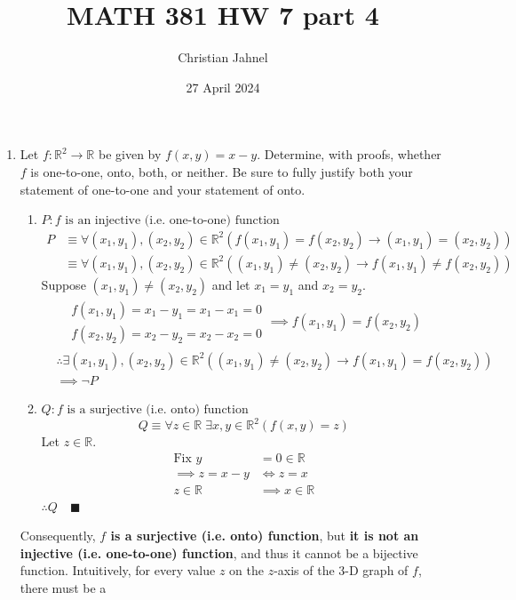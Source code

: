 \documentclass[letterpaper, 12pt]{article}
\title{MATH 381 HW 7 part 4}
\author{Christian Jahnel}
\date{27 April 2024}
\newcommand{\qed}{\quad \blacksquare}
\newcommand{\then}{\rightarrow}
\newcommand{\R}{\mathbb{R}}
\newcommand{\0}{\emptyset}
\begin{document}
\maketitle
\begin{enumerate}
\item Let $f: \R^2 \to \R$ be given by $f(x, y) = x - y$. Determine, with proofs, whether $f$ 
is one-to-one, onto, both, or neither. Be sure to fully justify both your statement of 
one-to-one and your statement of onto.
\begin{enumerate}
\item $P: \text{$f$ is an injective (i.e. one-to-one) function}$
\[\begin{split}
    P &\equiv \forall (x_1, y_1), (x_2, y_2) \in \R^2(f(x_1, y_1) = f(x_2, y_2) 
    \then (x_1, y_1) = (x_2, y_2)) \\
    &\equiv \forall (x_1, y_1), (x_2, y_2) \in \R^2((x_1, y_1) \ne (x_2, y_2) 
    \then f(x_1, y_1) \ne f(x_2, y_2))
\end{split}\]
Suppose $(x_1, y_1) \ne (x_2, y_2)$ and let $x_1 = y_1$ and $x_2 = y_2$.
\begin{gather*}
\begin{aligned}
    f(x_1, y_1) = x_1 - y_1 = x_1 - x_1 = 0 \\
    f(x_2, y_2) = x_2 - y_2 = x_2 - x_2 = 0
\end{aligned}
\implies f(x_1, y_1) = f(x_2, y_2)
\end{gather*}
\[\begin{split}
    &\therefore \exists (x_1, y_1), (x_2, y_2) \in \R^2 ((x_1, y_1) \ne (x_2, y_2) 
    \then f(x_1, y_1) = f(x_2, y_2)) \\
    &\implies \neg P
\end{split}\]
\item $Q: \text{$f$ is a surjective (i.e. onto) function}$
\[Q \equiv \forall z \in \R \; \exists x, y \in \R^2(f(x, y) = z)\]
Let $z \in \R$.
\begin{align*}
    \text{Fix } y &= 0 \in \R \\
    \implies z = x - y &\iff z = x \\
    z \in \R &\implies x \in \R
\end{align*}
$\therefore Q \qed$
\end{enumerate}
\begin{flushleft}
    Consequently, \textbf{$f$ is a surjective (i.e. onto) function}, but \textbf{it is not an 
    injective (i.e. one-to-one) function}, and thus it cannot be a bijective function. 
    Intuitively, for every value $z$ on the $z$-axis of the 3-D graph of $f$, there must be a 

\end{flushleft}
\end{enumerate}
\end{document}
